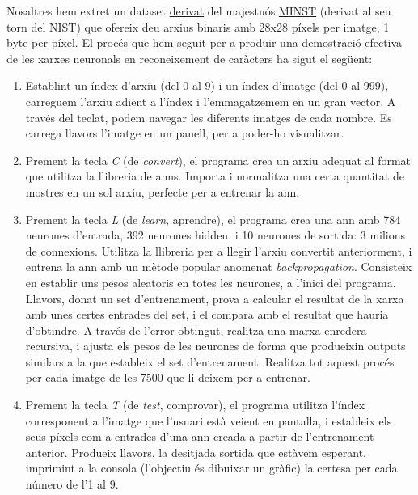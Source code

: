 Nosaltres hem extret un dataset \href{http://cis.jhu.edu/~sachin/digit/digit.html}{derivat} del majestuós \href{http://yann.lecun.com/exdb/mnist/}{MINST} (derivat al seu torn del NIST)
que ofereix deu arxius binaris amb 28x28 píxels per imatge, 1 byte per píxel. El procés que hem seguit per a produir una demostració efectiva de les 
xarxes neuronals en reconeixement de caràcters ha sigut el següent:

\begin{enumerate}
\item Establint un índex d'arxiu (del 0 al 9) i un índex d'imatge (del 0 al 999), carreguem l'arxiu adient a l'índex i l'emmagatzemem en un gran vector. A través del teclat, podem
navegar les diferents imatges de cada nombre. Es carrega llavors l'imatge en un panell, per a poder-ho visualitzar.
\item Prement la tecla \emph{C} (de \emph{convert}), el programa crea un arxiu adequat al format que utilitza la llibreria de \ac{ann}s. Importa i normalitza una certa quantitat 
de mostres en un sol arxiu, perfecte per a entrenar la \ac{ann}.
\item Prement la tecla \emph{L} (de \emph{learn}, aprendre), el programa crea una \ac{ann} amb 784 neurones d'entrada, 392 neurones hidden, i 10 neurones de sortida: 3 milions de connexions. Utilitza la 
llibreria per a llegir l'arxiu convertit anteriorment, i entrena la \ac{ann} amb un mètode popular anomenat \emph{backpropagation}. Consisteix en establir uns pesos aleatoris 
en totes les neurones, a l'inici del programa. Llavors, donat un set d'entrenament, prova a calcular el resultat de la xarxa amb unes certes entrades del set, i el compara amb el resultat
que hauria d'obtindre. A través de l'error obtingut, realitza una marxa enredera recursiva, i ajusta els pesos de les neurones de forma que produeixin outputs similars a la que
estableix el set d'entrenament. Realitza tot aquest procés per cada imatge de les 7500 que li deixem per a entrenar.
\item Prement la tecla \emph{T} (de \emph{test}, comprovar), el programa utilitza l'índex corresponent a l'imatge que l'usuari està veient en pantalla, i estableix els seus píxels
com a entrades d'una \ac{ann} creada a partir de l'entrenament anterior. Produeix llavors, la desitjada sortida que estàvem esperant, imprimint a la consola (l'objectiu és dibuixar un gràfic)
la certesa per cada número de l'1 al 9.
\end{enumerate}